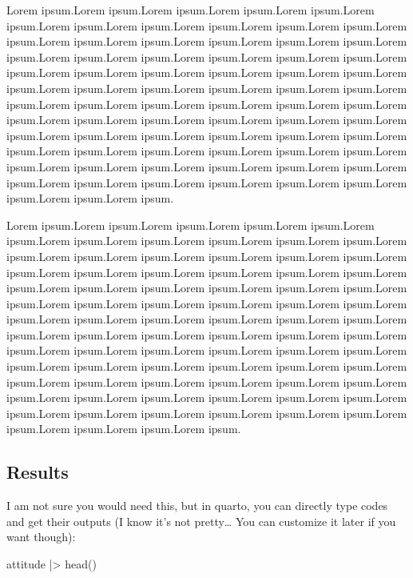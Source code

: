 \documentclass[
  11pt]{article}
\newenvironment{Shaded}{\begin{snugshade}}{\end{snugshade}}
\newcommand{\FunctionTok}[1]{\textcolor[rgb]{0.28,0.35,0.67}{#1}}
\newcommand{\NormalTok}[1]{\textcolor[rgb]{0.00,0.23,0.31}{#1}}
\newcommand{\SpecialCharTok}[1]{\textcolor[rgb]{0.37,0.37,0.37}{#1}}
\begin{document}
Lorem ipsum.Lorem ipsum.Lorem ipsum.Lorem ipsum.Lorem ipsum.Lorem
ipsum.Lorem ipsum.Lorem ipsum.Lorem ipsum.Lorem ipsum.Lorem ipsum.Lorem
ipsum.Lorem ipsum.Lorem ipsum.Lorem ipsum.Lorem ipsum.Lorem ipsum.Lorem
ipsum.Lorem ipsum.Lorem ipsum.Lorem ipsum.Lorem ipsum.Lorem ipsum.Lorem
ipsum.Lorem ipsum.Lorem ipsum.Lorem ipsum.Lorem ipsum.Lorem ipsum.Lorem
ipsum.Lorem ipsum.Lorem ipsum.Lorem ipsum.Lorem ipsum.Lorem ipsum.Lorem
ipsum.Lorem ipsum.Lorem ipsum.Lorem ipsum.Lorem ipsum.Lorem ipsum.Lorem
ipsum.Lorem ipsum.Lorem ipsum.Lorem ipsum.Lorem ipsum.Lorem ipsum.Lorem
ipsum.Lorem ipsum.Lorem ipsum.Lorem ipsum.Lorem ipsum.Lorem ipsum.Lorem
ipsum.Lorem ipsum.Lorem ipsum.Lorem ipsum.Lorem ipsum.Lorem ipsum.Lorem
ipsum.Lorem ipsum.Lorem ipsum.Lorem ipsum.Lorem ipsum.Lorem ipsum.Lorem
ipsum.Lorem ipsum.Lorem ipsum.Lorem ipsum.Lorem ipsum.Lorem ipsum.Lorem
ipsum.Lorem ipsum.Lorem ipsum.

Lorem ipsum.Lorem ipsum.Lorem ipsum.Lorem ipsum.Lorem ipsum.Lorem
ipsum.Lorem ipsum.Lorem ipsum.Lorem ipsum.Lorem ipsum.Lorem ipsum.Lorem
ipsum.Lorem ipsum.Lorem ipsum.Lorem ipsum.Lorem ipsum.Lorem ipsum.Lorem
ipsum.Lorem ipsum.Lorem ipsum.Lorem ipsum.Lorem ipsum.Lorem ipsum.Lorem
ipsum.Lorem ipsum.Lorem ipsum.Lorem ipsum.Lorem ipsum.Lorem ipsum.Lorem
ipsum.Lorem ipsum.Lorem ipsum.Lorem ipsum.Lorem ipsum.Lorem ipsum.Lorem
ipsum.Lorem ipsum.Lorem ipsum.Lorem ipsum.Lorem ipsum.Lorem ipsum.Lorem
ipsum.Lorem ipsum.Lorem ipsum.Lorem ipsum.Lorem ipsum.Lorem ipsum.Lorem
ipsum.Lorem ipsum.Lorem ipsum.Lorem ipsum.Lorem ipsum.Lorem ipsum.Lorem
ipsum.Lorem ipsum.Lorem ipsum.Lorem ipsum.Lorem ipsum.Lorem ipsum.Lorem
ipsum.Lorem ipsum.Lorem ipsum.Lorem ipsum.Lorem ipsum.Lorem ipsum.Lorem
ipsum.Lorem ipsum.Lorem ipsum.Lorem ipsum.Lorem ipsum.Lorem ipsum.Lorem
ipsum.Lorem ipsum.Lorem ipsum.Lorem ipsum.Lorem ipsum.Lorem ipsum.Lorem
ipsum.Lorem ipsum.Lorem ipsum.Lorem ipsum.

\subsection{Results}\label{sec-result}

I am not sure you would need this, but in quarto, you can directly type
codes and get their outputs (I know it's not pretty\ldots{} You can
customize it later if you want though):

\begin{Shaded}
\begin{Highlighting}[]
\NormalTok{attitude }\SpecialCharTok{|\textgreater{}} \FunctionTok{head}\NormalTok{()}
\end{Highlighting}
\end{Shaded}
\end{document}
